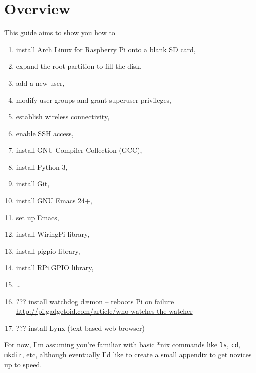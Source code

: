 \documentclass[12pt,letterpaper]{article}
\begin{document}
\section{Overview}
This guide aims to show you how to
\begin{enumerate}
\item install Arch Linux for Raspberry Pi onto a blank SD card,
\item expand the root partition to fill the disk,
\item add a new user,
\item modify user groups and grant superuser privileges,
\item establish wireless connectivity,
\item enable SSH access,
\item install GNU Compiler Collection (GCC), %
\item install Python 3,
\item install Git,
\item install GNU Emacs 24+,
\item set up Emacs,
\item install WiringPi library,
\item install pigpio library,
\item install RPi.GPIO library,
\item \ldots
\item ??? install watchdog d\ae mon -- reboots Pi on failure \url{http://pi.gadgetoid.com/article/who-watches-the-watcher}
\item ??? install Lynx (text-based web browser)
\end{enumerate}

For now, I'm assuming you're familiar with basic *nix commands like \lstinline{ls}, \lstinline{cd}, \lstinline{mkdir}, etc, although eventually I'd like to create a small appendix to get novices up to speed.
\end{document}
